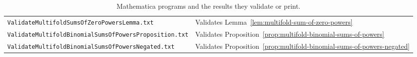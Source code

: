 \begin{table}[H]
\begin{tabular}{ll}
    \texttt{ValidateMultifoldSumsOfZeroPowersLemma.txt}
    & Validates Lemma~\eqref{lem:multifold-sum-of-zero-powers} \\
    \texttt{ValidateMultifoldBinomialSumsOfPowersProposition.txt}
    & Validates Proposition~\eqref{prop:multifold-binomial-sums-of-powers} \\
    \texttt{ValidateMultifoldBinomialSumsOfPowersNegated.txt}
    & Validates Proposition~\eqref{prop:multifold-binomial-sums-of-powers-negated} \\
    \bottomrule
  \end{tabular}
  \caption{Mathematica programs and the results they validate or print.}
  \label{tab:mathematica-programs}
\end{table}
